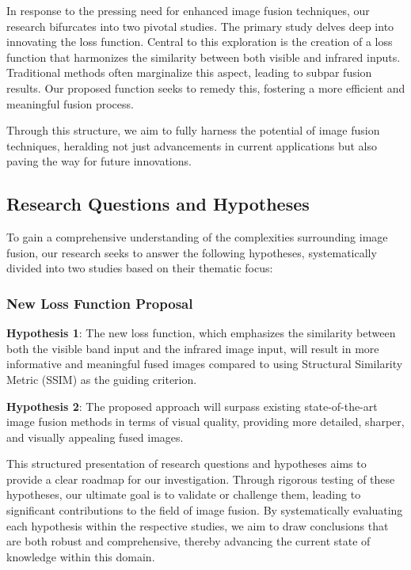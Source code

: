 In response to the pressing need for enhanced image fusion techniques, our research bifurcates into two pivotal studies. The primary study delves deep into innovating the loss function. Central to this exploration is the creation of a loss function that harmonizes the similarity between both visible and infrared inputs. Traditional methods often marginalize this aspect, leading to subpar fusion results. Our proposed function seeks to remedy this, fostering a more efficient and meaningful fusion process.

Through this structure, we aim to fully harness the potential of image fusion techniques, heralding not just advancements in current applications but also paving the way for future innovations.

\subsection{Research Questions and Hypotheses} \label{sec:researchquestions}

To gain a comprehensive understanding of the complexities surrounding image fusion, our research seeks to answer the following hypotheses, systematically divided into two studies based on their thematic focus:

\subsubsection{New Loss Function Proposal}

\begin{list}{}{}{}
    \item \textbf{Hypothesis 1}: The new loss function, which emphasizes the similarity between both the visible band input and the infrared image input, will result in more informative and meaningful fused images compared to using Structural Similarity Metric (SSIM) as the guiding criterion.
    \item \textbf{Hypothesis 2}: The proposed approach will surpass existing state-of-the-art image fusion methods in terms of visual quality, providing more detailed, sharper, and visually appealing fused images.
\end{list}

This structured presentation of research questions and hypotheses aims to provide a clear roadmap for our investigation. Through rigorous testing of these hypotheses, our ultimate goal is to validate or challenge them, leading to significant contributions to the field of image fusion. By systematically evaluating each hypothesis within the respective studies, we aim to draw conclusions that are both robust and comprehensive, thereby advancing the current state of knowledge within this domain.


